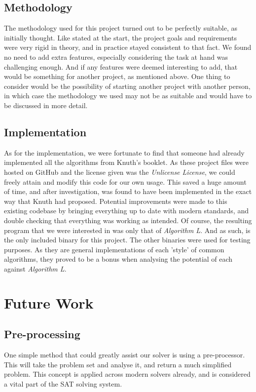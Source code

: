 \documentclass{article}
\begin{document}
\subsection{Methodology}
The methodology used for this project turned out to be perfectly suitable, as initially thought. Like stated at the start, the
project goals and requirements were very rigid in theory, and in practice stayed consistent to that fact. We found no need to add
extra features, especially considering the task at hand was challenging enough. And if any features were deemed interesting to
add, that would be something for another project, as mentioned above. One thing to consider would be the possibility of starting
another project with another person, in which case the methodology we used may not be as suitable and would have to be discussed
in more detail.

\subsection{Implementation}
As for the implementation, we were fortunate to find that someone had already implemented all the algorithms from Knuth's booklet.
As these project files were hosted on GitHub\cite{aaw} and the license given was the \textit{Unlicense License}, we could freely
attain and modify this code for our own usage. This saved a huge amount of time, and after investigation, was found to have been
implemented in the exact way that Knuth had proposed. Potential improvements were made to this existing codebase by bringing
everything up to date with modern standards, and double checking that everything was working as intended. Of course, the resulting
program that we were interested in was only that of \textit{Algorithm L}. And as such, is the only included binary for this
project. The other binaries were used for testing purposes. As they are general implementations of each 'style' of common
algorithms, they proved to be a bonus when analysing the potential of each against \textit{Algorithm L}.

\section{Future Work}
\subsection{Pre-processing}
One simple method that could greatly assist our solver is using a pre-processor. This will take the problem set and analyse it,
and return a much simplified problem. This concept is applied across modern solvers already, and is considered a vital part of
the SAT solving system.
\end{document}
